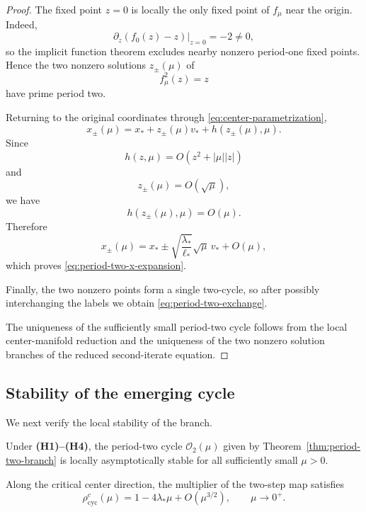 \begin{proof}
The fixed point $z=0$ is locally the only fixed point of
$f_\mu$ near the origin.  Indeed,
\[
\partial_z(f_0(z)-z)\big|_{z=0}
=
-2
\neq0,
\]
so the implicit function theorem excludes nearby nonzero
period-one fixed points.  Hence the two nonzero solutions
$z_\pm(\mu)$ of
\[
f_\mu^2(z)=z
\]
have prime period two.

Returning to the original coordinates through
\eqref{eq:center-parametrization},
\[
x_\pm(\mu)
=
x_*
+
z_\pm(\mu)v_*
+
h(z_\pm(\mu),\mu).
\]
Since
\[
h(z,\mu)
=
O(z^2+|\mu||z|)
\]
and
\[
z_\pm(\mu)=O(\sqrt{\mu}),
\]
we have
\[
h(z_\pm(\mu),\mu)=O(\mu).
\]
Therefore
\[
x_\pm(\mu)
=
x_*
\pm
\sqrt{\frac{\lambda_*}{\ell_*}}
\sqrt{\mu}\,v_*
+
O(\mu),
\]
which proves \eqref{eq:period-two-x-expansion}.

Finally, the two nonzero points form a single two-cycle, so after
possibly interchanging the labels we obtain
\eqref{eq:period-two-exchange}.

The uniqueness of the sufficiently small period-two cycle follows
from the local center-manifold reduction and the uniqueness of the
two nonzero solution branches of the reduced second-iterate
equation.
\end{proof}

\subsection{Stability of the emerging cycle}
\label{subsec:period-two-stability}

We next verify the local stability of the branch.

\begin{theorem}
\label{thm:period-two-stability}
Under \textbf{(H1)--(H4)}, the period-two cycle
$\mathcal O_2(\mu)$ given by
Theorem~\ref{thm:period-two-branch} is locally asymptotically stable
for all sufficiently small $\mu>0$.

Along the critical center direction, the multiplier of the
two-step map satisfies
\begin{equation}
\rho_{\mathrm{cyc}}^{c}(\mu)
=
1-4\lambda_*\mu
+
O(\mu^{3/2}),
\qquad
\mu\to0^+.
\label{eq:critical-cycle-multiplier}
\end{equation}
\end{theorem}

